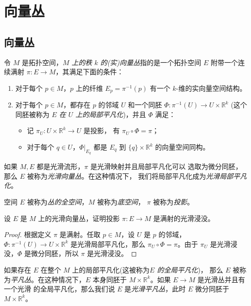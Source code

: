 

\chapter{向量丛}

\section{向量丛}

令 $M$ 是拓扑空间，\emph{$M$ 上的秩 $k$ 的(实)向量丛}指的是一个拓扑空间
$E$ 附带一个连续满射 $\pi:E\to M$，其满足下面的条件：
\begin{enumerate}
  \item 对于每个 $p\in M$，$p$ 上的纤维 $E_p=\pi^{-1}(p)$ 有一个
  $k$-维的实向量空间结构。
  \item 对于每个 $p\in M$，都存在 $p$ 的邻域 $U$ 和一个同胚
  $\varPhi:\pi^{-1}(U)\to U\times \mathbb{R}^k$ (这个同胚被称为
  \emph{$E$ 在 $U$ 上的局部平凡化})，并且 $\varPhi$ 满足：
  \begin{itemize}[nosep]
    \item 记 $\pi_U:U\times \mathbb{R}^k\to U$ 是投影，
    有 $\pi_U\circ\varPhi=\pi$；
    \item 对于每个 $q\in U$，$\varPhi|_{{E_q}}$ 都是
    $E_q$ 到 $\{q\}\times \mathbb{R}^k$ 的向量空间同构。
  \end{itemize}
\end{enumerate} 
如果 $M,E$ 都是光滑流形，$\pi$ 是光滑映射并且局部平凡化可以
选取为微分同胚，那么 $E$ 被称为\emph{光滑向量丛}。在这种情况下，
我们将局部平凡化成为\emph{光滑局部平凡化}。

空间 $E$ 被称为\emph{丛的全空间}，$M$ 被称为\emph{底空间}，
$\pi$ 被称为\emph{投影}。

\begin{exercise}
  设 $E$ 是 $M$ 上的光滑向量丛，证明投影 $\pi:E\to M$
  是满射的光滑浸没。
\end{exercise}
\begin{proof}
  根据定义 $\pi$ 是满射。任取 $p\in M$，设 $U$ 是 $p$ 的邻域，
  $\varPhi:\pi^{-1}(U)\to U\times \mathbb{R}^k$ 是光滑局部平凡化，那么
  $\pi_U\circ\varPhi=\pi$。由于 $\pi_U$ 是光滑浸没，$\varPhi$
  是微分同胚，所以 $\pi$ 是光滑浸没。
\end{proof}

如果存在 $E$ 在整个 $M$ 上的局部平凡化(这被称为\emph{$E$ 的全局平凡化})，
那么 $E$ 被称为\emph{平凡丛}。在这种情况下，$E$ 本身同胚于
$M\times \mathbb{R}^k$。如果 $E\to M$ 是光滑丛并且有一个光滑
的全局平凡化，那么我们说 $E$ 是\emph{光滑平凡丛}，此时
$E$ 微分同胚于 $M\times \mathbb{R}^k$。


